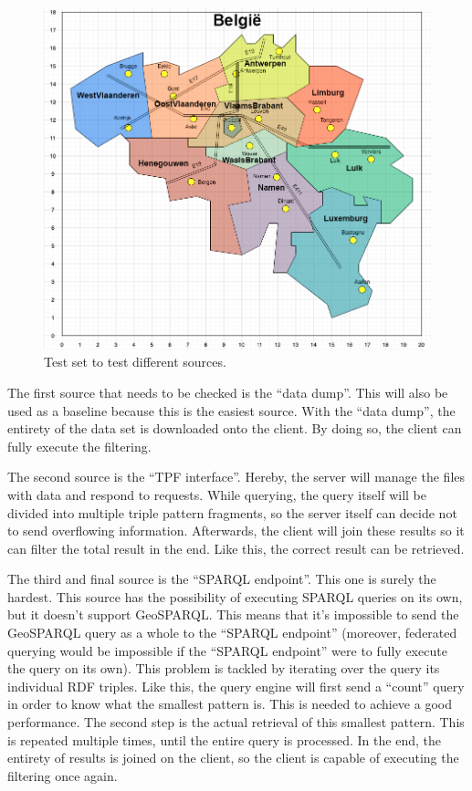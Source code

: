 \documentclass[twocolumn]{phdsymp} %
\begin{document}
\begin{figure}
    \centering
    \includegraphics[width=\linewidth]{images/geosparql_demo.png}
    \caption{Test set to test different sources.}
    \label{fig:abstr_demoset}
\end{figure}

The first source that needs to be checked is the ``data dump''. This will also be used as a baseline because this is the easiest source. With the ``data dump'', the entirety of the data set is downloaded onto the client. By doing so, the client can fully execute the filtering.

The second source is the ``TPF interface''. Hereby, the server will manage the files with data and respond to requests. While querying, the query itself will be divided into multiple triple pattern fragments, so the server itself can decide not to send overflowing information. Afterwards, the client will join these results so it can filter the total result in the end. Like this, the correct result can be retrieved.

The third and final source is the ``SPARQL endpoint''. This one is surely the hardest. This source has the possibility of executing SPARQL queries on its own, but it doesn't support GeoSPARQL. This means that it's impossible to send the GeoSPARQL query as a whole to the ``SPARQL endpoint'' (moreover, federated querying would be impossible if the ``SPARQL endpoint'' were to fully execute the query on its own). This problem is tackled by iterating over the query its individual RDF triples. Like this, the query engine will first send a ``count'' query in order to know what the smallest pattern is. This is needed to achieve a good performance. The second step is the actual retrieval of this smallest pattern. This is repeated multiple times, until the entire query is processed. In the end, the entirety of results is joined on the client, so the client is capable of executing the filtering once again.
\end{document}
